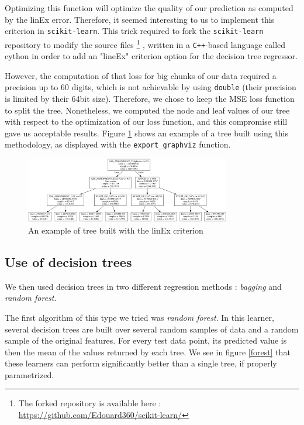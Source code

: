 \documentclass[a4paper,10pt]{article}
\begin{document}
  Optimizing this function will optimize the quality of our prediction as computed by the linEx error. Therefore, it seemed interesting to us to implement this criterion in {\tt scikit-learn}. This trick required to fork the {\tt scikit-learn} repository to modify the source files
    \footnote{\label{note_git}The forked repository is available here : \url{https://github.com/Edouard360/scikit-learn/}}
  , written in a {\tt C++}-based language called cython in order to add an "lineEx" criterion option for the decision tree regressor.


  However, the computation of that loss for big chunks of our data required a precision up to 60 digits, which is not achievable by using {\tt double} (their precision is limited by their 64bit size). Therefore, we chose to keep the MSE loss function to split the tree. Nonetheless, we computed the node and leaf values of our tree with respect to the optimization of our loss function, and this compromise still gave us acceptable results. Figure \ref{tree_example} shows an example of a tree built using this methodology, as displayed with the {\tt export\_graphviz} function.
  \begin{figure}
    \centering
    \includegraphics[width=0.8\textwidth]{graphics/tree.png}
    \caption{An example of tree built with the linEx criterion}
      \label{tree_example}
  \end{figure}

  \subsection{Use of decision trees}

  We then used decision trees in two different regression methods : \emph{bagging} and \emph{random forest}.

  The first algorithm of this type we tried was \emph{random forest}. In this learner, several decision trees are built over several random samples of data and a random sample of the original features. For every test data point, its predicted value is then the mean of the values returned by each tree. We see in figure \ref{forest} that these learners can perform significantly better than a single tree, if properly parametrized.
\end{document}
